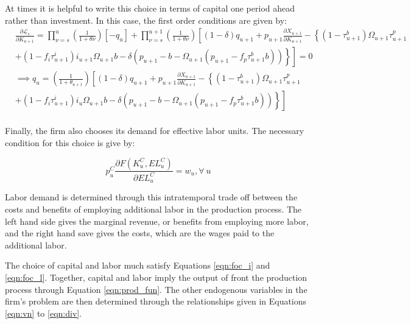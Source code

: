 At times it is helpful to write this choice in terms of capital one period ahead rather than investment.  In this case, the first order conditions are given by:
 \begin{equation}
\label{eqn:foc_k}
\begin{split}
& \frac{\partial \mathcal{L}_{s}}{\partial K_{u+1}}  =  \prod_{\nu=s}^{u}\left(\frac{1}{1+\theta{\nu}}\right)\left[-q_{u}\right]  +  \prod_{\nu=s}^{u+1} \left(\frac{1}{1+\theta{\nu}}\right)\left[(1-\delta)q_{u+1} +p_{u+1} \frac{\partial X_{u+1}}{\partial K_{u+1}}- \left\{(1-\tau^{b}_{u+1})\Omega_{u+1}\tau^{p}_{u+1} \right.\right. \\
 &\left.\left.+(1-f_{i}\tau^{i}_{u+1})i_{u+1}\Omega_{u+1}b-\delta(p_{u+1}-b-\Omega_{u+1}(p_{u+1}-f_{p}\tau^{b}_{u+1}b))\right\}   \right] = 0 \\
& \implies  q_{u}  = \left(\frac{1}{1+\theta_{u+1}}\right) \left[(1-\delta)q_{u+1} +p_{u+1} \frac{\partial X_{u+1}}{\partial K_{u+1}}- \left\{(1-\tau^{b}_{u+1})\Omega_{u+1}\tau^{p}_{u+1} \right.\right. \\
&\left.\left.+(1-f_{i}\tau^{i}_{u+1})i_{u}\Omega_{u+1}b-\delta(p_{u+1}-b-\Omega_{u+1}(p_{u+1}-f_{p}\tau^{b}_{u+1}b))\right\}   \right]  \\
\end{split}
\end{equation}

Finally, the firm also chooses its demand for effective labor units.  The necessary condition for this choice is give by:

\begin{equation}
\label{eqn:foc_l}
p^{C}_{u}\frac{\partial F(K^{C}_{u},EL^{C}_{u})}{\partial EL^{C}_{u}}=w_{u}, \forall \ u
\end{equation}

\noindent\noindent Labor demand is determined through this intratemporal trade off between the costs and benefits of employing additional labor in the production process.  The left hand side gives the marginal revenue, or benefits from employing more labor, and the right hand save gives the costs, which are the wages paid to the additional labor.

The choice of capital and labor much satisfy Equations \ref{eqn:foc_i} and \ref{eqn:foc_l}.  Together, capital and labor imply the output of front the production process through Equation \ref{eqn:prod_fun}.  The other endogenous variables in the firm's problem are then determined through the relationships given in Equations \ref{eqn:vn} to \ref{eqn:div}.

